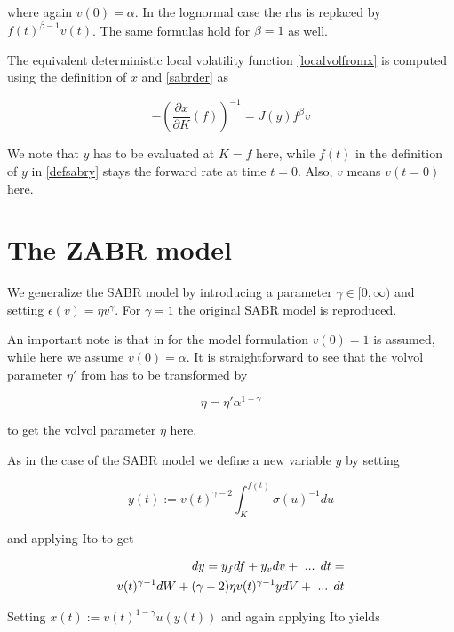 \documentclass{amsart}
\theoremstyle{plain}
\numberwithin{equation}{section}
\begin{document}
where again $v(0)=\alpha$. In the lognormal case the rhs is replaced by $f(t)^{\beta-1}v(t)$. The same formulas hold for $\beta=1$ as well.

The equivalent deterministic local volatility function \ref{localvolfromx} is computed using the definition of $x$ and \ref{sabrder} as

\begin{equation}\label{sabrlocalvol}
- \left( \frac{\partial x}{\partial K} (f) \right)^{-1} = J(y) f^{\beta} v
\end{equation}

We note that $y$ has to be evaluated at $K=f$ here, while $f(t)$ in the definition of $y$ in \ref{defsabry} stays the forward rate at time $t=0$. Also, $v$ means $v(t=0)$ here.

\section{The ZABR model}
We generalize the SABR model by introducing a parameter $\gamma \in [0,\infty)$ and setting $\epsilon(v) = \eta v^\gamma$. For $\gamma=1$ the original
SABR model is reproduced.

An important note is that in \cite{zabr} for the model formulation $v(0)=1$ is assumed, while here we assume $v(0)=\alpha$. It is straightforward to see that the volvol parameter $\eta'$ from \cite{zabr} has to be transformed by

\begin{equation}
\eta = \eta' \alpha^{1-\gamma}
\end{equation}

to get the volvol parameter $\eta$ here.

As in the case of the SABR model we define a new variable $y$ by setting

\begin{equation}\label{defzabry}
y(t) := v(t)^{\gamma-2}\int_{K}^{f(t)} \sigma(u)^{-1} du
\end{equation}

and applying Ito to get

\begin{eqnarray}
dy = y_f df + y_v dv + \textnormal{ ... } dt = \\
v(t)^{\gamma -1} dW + (\gamma -2) \eta v(t)^{\gamma-1} y dV + \textnormal{ ... } dt
\end{eqnarray}

Setting $x(t) := v(t)^{1-\gamma}u(y(t))$ and again applying Ito yields
\end{document}
